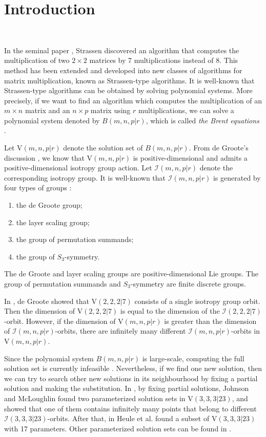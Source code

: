 \documentclass[reqno]{amsart}
\theoremstyle{definition}
\numberwithin{equation}{section}
\theoremstyle{remark}
\begin{document}
\section{Introduction}\label{se:intro}
\

In the seminal paper \cite{Stra-69}, Strassen discovered an algorithm that computes the multiplication of two $2\times 2$ matrices by 7 multiplications instead of 8. This method has been extended and developed into new classes of algorithms for matrix multiplication, known as Strassen-type algorithms. It is well-known that Strassen-type algorithms can be obtained by solving polynomial systems. More precisely, if we want to find an algorithm which computes the multiplication of an $m\times n$ matrix and an $n\times p$ matrix using $r$ multiplications, we can solve a polynomial system denoted by $B(m,n,p|r)$, which is called \emph{the Brent equations} \cite{Brent70,Heule21}.

Let $\mathrm{V}(m,n,p|r)$ denote the solution set of $B(m,n,p|r)$. From de Groote’s discussion \cite{deGr78-1,deGr78-2}, we know that $\mathrm{V}(m,n,p|r)$ is positive-dimensional and admits a positive-dimensional isotropy group action. Let $\mathcal{I}(m,n,p|r)$ denote the corresponding isotropy group. It is well-known that $\mathcal{I}(m,n,p|r)$ is generated by four types of groups \cite{Bur15,Heule21,kaumoo22}:
\begin{enumerate}
  \item the de Groote group;
  \item the layer scaling group;
  \item the group of permutation summands;
  \item the group of $S_3$-symmetry.
\end{enumerate}
The  de Groote and layer scaling groups are positive-dimensional Lie groups. The group of permutation summands and  $S_3$-symmetry are finite discrete groups.

In \cite{deGr78-2}, de Groote showed that $\mathrm{V}(2,2,2|7)$ consists of a single isotropy group orbit.  Then the dimension of $\mathrm{V}(2,2,2|7)$ is equal to the dimension of the  $\mathcal{I}(2,2,2|7)$-orbit. However, if the dimension of $\mathrm{V}(m,n,p|r)$ is greater than the dimension of $\mathcal{I}(m,n,p|r)$-orbits, there are infinitely many different $\mathcal{I}(m,n,p|r)$-orbits in $\mathrm{V}(m,n,p|r)$. 

Since the polynomial system $B(m,n,p|r)$ is large-scale, 
computing the full solution set is currently infeasible \cite{Heule21}. Nevertheless, if we find one new solution, then we can try to search other new solutions in its neighbourhood by fixing a partial solution and making the substitution. In \cite{JohnMc86}, by fixing partial solutions, Johnson and McLoughlin found two parameterized solution sets in $\mathrm{V}(3,3,3|23)$, and showed that one of them contains infinitely many points that belong to different $\mathcal{I}(3,3,3|23)$-orbits.  After that, in \cite{Heule21} Heule et al. found a subset of $\mathrm{V}(3,3,3|23)$ with 17 parameters. Other parameterized solution sets can be found in \cite{CV25}.
\end{document}
